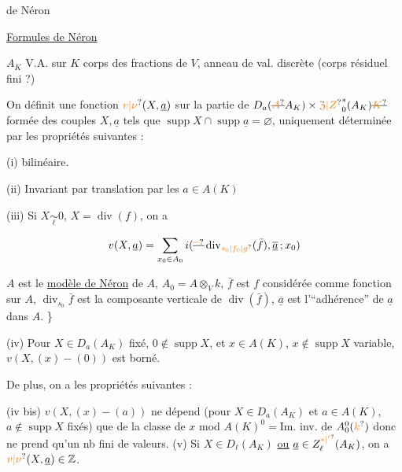 \hfill {} de Néron
\begin{center}\uline{Formules de Néron}\end{center}

$A_K$ V.A. sur $K$ corps des fractions de $V$, anneau
de val. discrète (corps résiduel fini  ?)

On définit une fonction $\unsure{v|\nu}(X,\underline a)$  sur la partie
de $D_a(\deleted{\unsure{A}}A_K)\times\unsure{\mathfrak Z|Z}_0^*(A_K)\deleted{\unsure{K}}$ formée des couples $X,\underline a$ tels
que $\operatorname{supp}X\cap\operatorname{supp}\underline a=\varnothing$, uniquement déterminée
par les propriétés suivantes :

(i) bilinéaire.

(ii) Invariant par translation par les $a\in A(K)$

(iii) Si $X\underset{\ell}{\sim}0$,   $X=\operatorname{div}(f)$, on a

\[
 v(X,\underline a)=\sum_{x_0\in A_0}i(\deleted{\unsure{\overline{\phantom{x}}}}\operatorname{div}_{\unsure{s_0|f_0|g}}(\bar f),\overline{\underline a}\,;x_0)
\]


$A$ est le \uline{modèle de Néron} de $A$, $A_0
=A\otimes_V k$, $\bar f$ est $f$ considérée comme fonction sur $A$,
 $\operatorname{div}_{s_0}\bar f$ est la composante verticale de $\operatorname{div}(\bar f)$,
$\overline{\underline a}$ est l’``adhérence'' de $\underline a$ dans $A$. \}

(iv) Pour $X\in D_a(A_K)$ fixé, $0\notin\operatorname{supp}X$, et
$x\in A(K)$, $x\notin\operatorname{supp}X$ variable, $v(X,(x)-(0))$ est
borné.

De plus, on a les propriétés suivantes :

(iv bis) $v(X,(x)-(a))$ ne dépend (pour $X\in D_a(A_K)$
 et $a\in A(K)$, $a\notin\operatorname{supp}X$ fixés) 
que de la classe de $x$ mod $A(K)^0={}$Im. inv. de $A_0^0(\unsure{k})$
donc ne prend qu’un nb fini de valeurs.
(v) Si $X\in D_\ell(A_K)$ \uline{ou} $\underline a\in Z_\ell^{\unsure{*|'}}(A_K)$, on a
$\unsure{v|\nu}(X,\underline a)\in\mathbb Z$.

